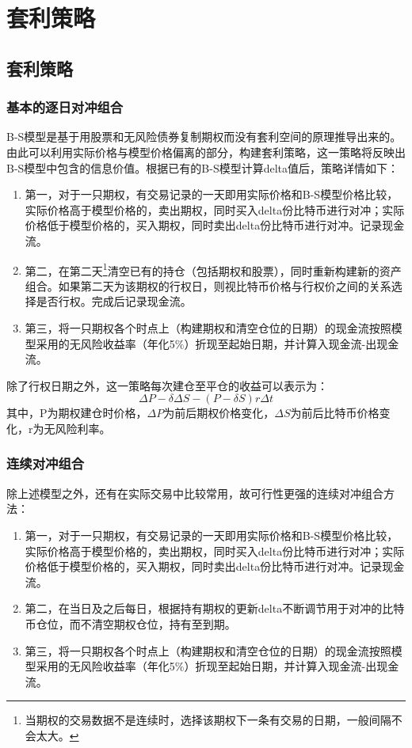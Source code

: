 \chapter{套利策略}

\section{套利策略} 
\subsection{基本的逐日对冲组合}\label{strategy}
    B-S模型是基于用股票和无风险债券复制期权而没有套利空间的原理推导出来的。由此可以利用实际价格与模型价格偏离的部分，构建套利策略，这一策略将反映出B-S模型中包含的信息价值。根据已有的B-S模型计算delta值后，策略详情如下：
    \begin{enumerate}[(1)]
        \item 第一，对于一只期权，有交易记录的一天即用实际价格和B-S模型价格比较，实际价格高于模型价格的，卖出期权，同时买入delta份比特币进行对冲；实际价格低于模型价格的，买入期权，同时卖出delta份比特币进行对冲。记录现金流。
        \item 第二，在第二天\footnote{当期权的交易数据不是连续时，选择该期权下一条有交易的日期，一般间隔不会太大。}清空已有的持仓（包括期权和股票），同时重新构建新的资产组合。如果第二天为该期权的行权日，则视比特币价格与行权价之间的关系选择是否行权。完成后记录现金流。
        \item 第三，将一只期权各个时点上（构建期权和清空仓位的日期）的现金流按照模型采用的无风险收益率（年化5$\%$）折现至起始日期，并计算入现金流-出现金流。
    \end{enumerate}
    除了行权日期之外，这一策略每次建仓至平仓的收益可以表示为：
    \begin{equation}
        \Delta{P}-\delta{\Delta{S}}-(P-\delta{S})r\Delta{t}
    \end{equation}
    其中，P为期权建仓时价格，$\Delta{P}$为前后期权价格变化，$\Delta{S}$为前后比特币价格变化，r为无风险利率。
\subsection{连续对冲组合}\label{continuous}
除上述模型之外，还有在实际交易中比较常用，故可行性更强的连续对冲组合方法：
\begin{enumerate}[(1)]
    \item 第一，对于一只期权，有交易记录的一天即用实际价格和B-S模型价格比较，实际价格高于模型价格的，卖出期权，同时买入delta份比特币进行对冲；实际价格低于模型价格的，买入期权，同时卖出delta份比特币进行对冲。记录现金流。
    \item 第二，在当日及之后每日，根据持有期权的更新delta不断调节用于对冲的比特币仓位，而不清空期权仓位，持有至到期。
    \item 第三，将一只期权各个时点上（构建期权和清空仓位的日期）的现金流按照模型采用的无风险收益率（年化5$\%$）折现至起始日期，并计算入现金流-出现金流。
\end{enumerate}
